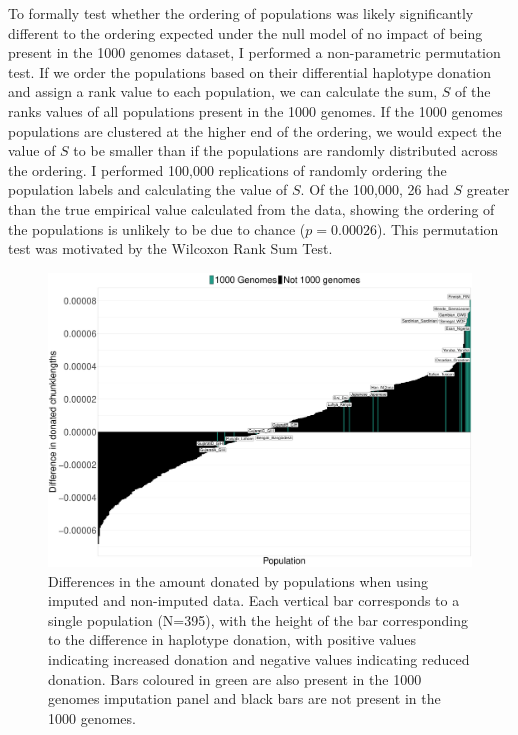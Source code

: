 To formally test whether the ordering of populations was likely significantly different to the ordering expected under the null model of no impact of being present in the 1000 genomes dataset, I performed a non-parametric permutation test. If we order the populations based on their differential haplotype donation and assign a rank value to each population, we can calculate the sum, $S$ of the ranks values of all populations present in the 1000 genomes. If the 1000 genomes populations are clustered at the higher end of the ordering, we would expect the value of $S$ to be smaller than if the populations are randomly distributed across the ordering. I performed 100,000 replications of randomly ordering the population labels and calculating the value of $S$. Of the 100,000, 26 had $S$ greater than the true empirical value calculated from the data, showing the ordering of the populations is unlikely to be due to chance ($p=0.00026$). This permutation test was motivated by the Wilcoxon Rank Sum Test.  

\begin{figure}
	    \centering
	    \includegraphics[width=1.0\textwidth]{../images/chapter3/imputed_excess_copying_pops.pdf}
	    \caption{Differences in the amount donated by populations when using imputed and non-imputed data. Each vertical bar corresponds to a single population (N=395), with the height of the bar corresponding to the difference in haplotype donation, with positive values indicating increased donation and negative values indicating reduced donation. Bars coloured in green are also present in the 1000 genomes imputation panel and black bars are not present in the 1000 genomes.}
	    \label{fig:imputed_excess_copying_pops}
\end{figure}

